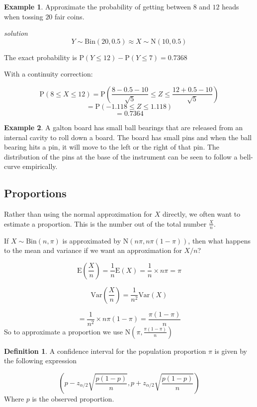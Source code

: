 \documentclass[
]{book}
\theoremstyle{definition}
\newtheorem{definition}{Definition}[chapter]
\theoremstyle{definition}
\newtheorem{example}{Example}[chapter]
\theoremstyle{definition}
\theoremstyle{definition}
\theoremstyle{remark}
\begin{document}
\begin{example}
Approximate the probability of getting between \(8\) and \(12\) heads when tossing \(20\) fair coins.

\emph{solution}
\[Y \sim \text{Bin}(20,0.5) \approx X\sim \text{N}(10,0.5)\]

The exact probability is \(\text{P}(Y\leq 12) - \text{P}(Y\leq 7) = 0.7368\)

With a continuity correction:

\[\text{P}(8\leq X\leq12) = \text{P}\left(\frac{8-0.5-10}{\sqrt{5}} \leq Z \leq \frac{12+0.5-10}{\sqrt{5}} \right) \]
\[=\text{P}(-1.118\leq Z \leq 1.118)\]
\[=0.7364\]
\end{example}

\begin{example}
A galton board has small ball bearings that are released from an internal cavity to roll down a board. The board has small pins and when the ball bearing hits a pin, it will move to the left or the right of that pin. The distribution of the pins at the base of the instrument can be seen to follow a bell-curve empirically.
\end{example}

\hypertarget{proportions}{%
\subsection{Proportions}\label{proportions}}

Rather than using the normal approximation for \(X\) directly, we often want to estimate a proportion. This is the number out of the total number \(\frac{X}{n}\).

If \(X\sim \text{Bin}(n,\pi)\) is approximated by \(\text{N}(n\pi,n\pi(1-\pi))\), then what happens to the mean and variance if we want an approximation for \(X/n\)?

\[\text{E}\left(\frac{X}{n}\right) = \frac{1}{n}\text{E}(X)=\frac{1}{n}\times n\pi = \pi\]

\[\text{Var}\left(\frac{X}{n}\right) = \frac{1}{n^2}\text{Var}(X)\]

\[= \frac{1}{n^2}\times n\pi(1-\pi) = \frac{\pi(1-\pi)}{n}\]
So to approximate a proportion we use \(\text{N}(\pi,\frac{\pi(1-\pi)}{n})\)

\begin{definition}
A confidence interval for the population proportion \(\pi\) is given by the following expression

\[\left(p - z_{\alpha/2}\sqrt{\frac{p(1-p)}{n}}, p + z_{\alpha/2}\sqrt{\frac{p(1-p)}{n}}\right)\]
Where \(p\) is the observed proportion.
\end{definition}
\end{document}
